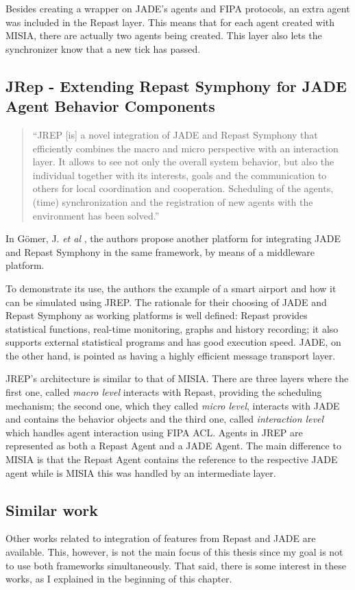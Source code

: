 	Besides creating a wrapper on JADE's agents and FIPA protocols, an extra agent was included in the Repast layer. This means that for each agent created with MISIA, there are actually two agents being created. This layer also lets the synchronizer know that a new tick has passed.

\subsection{JRep - Extending Repast Symphony for JADE Agent Behavior Components}
\begin{quote}
	``JREP [is] a novel integration of JADE and Repast Symphony that efficiently combines the macro and micro perspective with an interaction layer. It allows to see not only the overall system behavior, but also the individual together with its interests, goals and the communication to
	others for local coordination and cooperation. Scheduling of the agents, (time) synchronization and the registration of new agents with the environment has been solved.'' \cite{gormer2011jrep}
\end{quote}

	In Gömer, J. \textit{et al} \cite{gormer2011jrep}, the authors propose another platform for integrating JADE and Repast Symphony in the same framework, by means of a middleware platform.

	To demonstrate its use, the authors the example of a smart airport and how it can be simulated using JREP.
	The rationale for their choosing of JADE and Repast Symphony as working platforms is well defined:
	Repast provides statistical functions, real-time monitoring, graphs and history recording; it also supports external statistical programs and has good execution speed.
	JADE, on the other hand, is pointed as having a highly efficient message transport layer. 

	JREP's architecture is similar to that of MISIA. There are three layers where the first one, called \textit{macro level} interacts with Repast, providing the scheduling mechanism; the second one, which they called \textit{micro level}, interacts with JADE and contains the behavior objects and the third one, called \textit{interaction level} which handles agent interaction using FIPA ACL.
	Agents in JREP are represented as both a Repast Agent and a JADE Agent. The main difference to MISIA is that the Repast Agent contains the reference to the respective JADE agent while is MISIA this was handled by an intermediate layer.

\subsection{Similar work}
	Other works related to integration of features from Repast and JADE are available. This, however, is not the main focus of this thesis since my goal is not to use both frameworks simultaneously. That said, there is some interest in these works, as I explained in the beginning of this chapter. 


